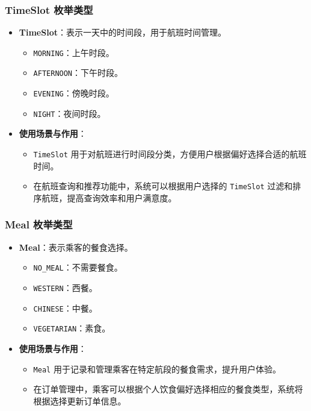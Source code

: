 \documentclass[UTF8, a4paper,12pt]{ctexart}
\begin{document}
\subsubsection{TimeSlot 枚举类型}

\begin{itemize}
    \item \textbf{TimeSlot}：表示一天中的时间段，用于航班时间管理。
    \begin{itemize}
        \item \texttt{MORNING}：上午时段。
        \item \texttt{AFTERNOON}：下午时段。
        \item \texttt{EVENING}：傍晚时段。
        \item \texttt{NIGHT}：夜间时段。
    \end{itemize}
    \item \textbf{使用场景与作用}：
    \begin{itemize}
        \item \texttt{TimeSlot} 用于对航班进行时间段分类，方便用户根据偏好选择合适的航班时间。
        \item 在航班查询和推荐功能中，系统可以根据用户选择的 \texttt{TimeSlot} 过滤和排序航班，提高查询效率和用户满意度。
    \end{itemize}
\end{itemize}

\subsubsection{Meal 枚举类型}

\begin{itemize}
    \item \textbf{Meal}：表示乘客的餐食选择。
    \begin{itemize}
        \item \texttt{NO\_MEAL}：不需要餐食。
        \item \texttt{WESTERN}：西餐。
        \item \texttt{CHINESE}：中餐。
        \item \texttt{VEGETARIAN}：素食。
    \end{itemize}
    \item \textbf{使用场景与作用}：
    \begin{itemize}
        \item \texttt{Meal} 用于记录和管理乘客在特定航段的餐食需求，提升用户体验。
        \item 在订单管理中，乘客可以根据个人饮食偏好选择相应的餐食类型，系统将根据选择更新订单信息。
    \end{itemize}
\end{itemize}
\end{document}
